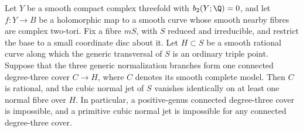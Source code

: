 
\begin{proposition}\hypertarget{tag-01BW}{}\label{cdp:st:C.2.D4.1}


Let $Y$ be a smooth compact complex threefold with
$b_2(Y;\Q)=0$, and let $f:Y\to B$ be a holomorphic map to a
smooth curve whose smooth nearby fibres are complex two-tori.
Fix a fibre $mS$, with $S$ reduced and irreducible, and restrict
the base to a small coordinate disc about it. Let
$H\subset S$ be a smooth rational curve along which the generic
transversal of $S$ is an ordinary triple point. Suppose that the
three generic normalization branches form one connected degree-three
cover $C\to H$, where $C$ denotes its smooth complete model.
Then $C$ is rational, and the cubic normal jet of $S$ vanishes
identically on at least one normal fibre over $H$.
In particular, a positive-genus connected degree-three cover is
impossible, and a primitive cubic normal jet is impossible for
any connected degree-three cover.
\end{proposition}

